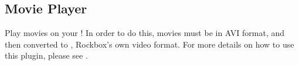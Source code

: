 \subsection{Movie Player}
Play movies on your \dap!  In order to do this, movies must be in AVI format,
and then converted to , Rockbox's own video format. For more
details on how to use this plugin, please see
.

